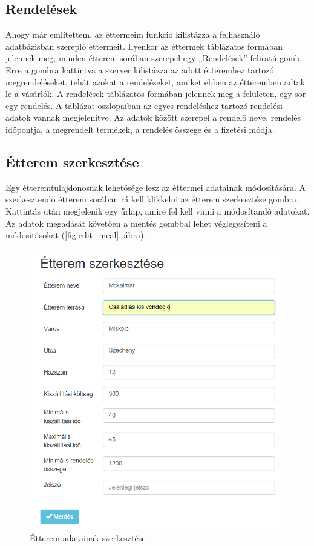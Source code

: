 \subsection{Rendelések}

Ahogy már említettem, az éttermeim funkció kilistázza a felhasználó adatbázisban szereplő éttermeit. Ilyenkor az éttermek táblázatos formában jelennek meg, minden étterem sorában szerepel egy „Rendelések” feliratú gomb. Erre a gombra kattintva a szerver kilistázza az adott étteremhez tartozó megrendeléseket, tehát azokat a rendeléseket, amiket ebben az étteremben adtak le a vásárlók. A rendelések táblázatos formában jelennek meg a felületen, egy sor egy rendelés. A táblázat oszlopaiban az egyes rendeléshez tartozó rendelési adatok vannak megjelenítve. Az adatok között szerepel a rendelő neve, rendelés időpontja, a megrendelt termékek, a rendelés összege és a fizetési módja.

\subsection{Étterem szerkesztése}

Egy étteremtulajdonosnak lehetősége lesz az éttermei adatainak módosítására. A szerkesztendő étterem sorában rá kell klikkelni az étterem szerkesztése gombra. Kattintás után megjelenik egy űrlap, amire fel kell vinni a módosítandó adatokat. Az adatok megadását követően a mentés gombbal lehet véglegesíteni a módosításokat (\ref{fig:edit_meal}. ábra).

\begin{figure}
\centering
\includegraphics[scale=0.8]{kepek/edit_restaurant.png}
\caption{Étterem adatainak szerkesztése}
\label{fig:edit_restaurnt}
\end{figure}

